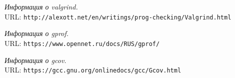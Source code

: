 \begin{thebibliography}{99}

{\itshape Информация о valgrind.} \\URL: \texttt{http://alexott.net/en/writings/prog-checking/Valgrind.html}

{\itshape Информация о gprof.} \\URL: \texttt{https://www.opennet.ru/docs/RUS/gprof/}

{\itshape Информация о gcov.} \\URL: \texttt{https://gcc.gnu.org/onlinedocs/gcc/Gcov.html}
\end{thebibliography}
\pagebreak



